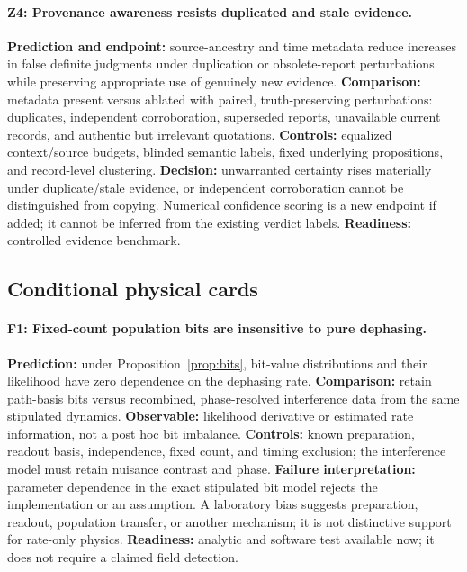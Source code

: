 \paragraph{Z4: Provenance awareness resists duplicated and stale evidence.}
\textbf{Prediction and endpoint:} source-ancestry and time metadata reduce increases in false definite judgments under duplication or obsolete-report perturbations while preserving appropriate use of genuinely new evidence. \textbf{Comparison:} metadata present versus ablated with paired, truth-preserving perturbations: duplicates, independent corroboration, superseded reports, unavailable current records, and authentic but irrelevant quotations. \textbf{Controls:} equalized context/source budgets, blinded semantic labels, fixed underlying propositions, and record-level clustering. \textbf{Decision:} unwarranted certainty rises materially under duplicate/stale evidence, or independent corroboration cannot be distinguished from copying. Numerical confidence scoring is a new endpoint if added; it cannot be inferred from the existing verdict labels. \textbf{Readiness:} controlled evidence benchmark.

\subsection{Conditional physical cards}
\paragraph{F1: Fixed-count population bits are insensitive to pure dephasing.}
\textbf{Prediction:} under Proposition~\ref{prop:bits}, bit-value distributions and their likelihood have zero dependence on the dephasing rate. \textbf{Comparison:} retain path-basis bits versus recombined, phase-resolved interference data from the same stipulated dynamics. \textbf{Observable:} likelihood derivative or estimated rate information, not a post hoc bit imbalance. \textbf{Controls:} known preparation, readout basis, independence, fixed count, and timing exclusion; the interference model must retain nuisance contrast and phase. \textbf{Failure interpretation:} parameter dependence in the exact stipulated bit model rejects the implementation or an assumption. A laboratory bias suggests preparation, readout, population transfer, or another mechanism; it is not distinctive support for rate-only physics. \textbf{Readiness:} analytic and software test available now; it does not require a claimed field detection.

